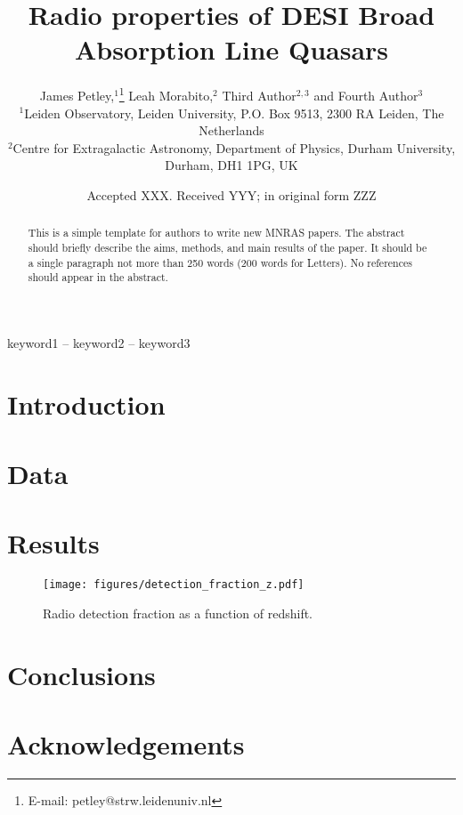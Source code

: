 \documentclass[fleqn,usenatbib]{mnras}
\title[DESI Radio BALQSOs]{Radio properties of DESI Broad Absorption Line Quasars}
\author[Petley et al.]{
James Petley,$^{1}$\thanks{E-mail: petley@strw.leidenuniv.nl}
Leah Morabito,$^{2}$
Third Author$^{2,3}$
and Fourth Author$^{3}$
\\
$^{1}$Leiden Observatory, Leiden University, P.O. Box 9513, 2300 RA Leiden, The Netherlands\\
$^{2}$Centre for Extragalactic Astronomy, Department of Physics, Durham University, Durham, DH1 1PG, UK\\
}
\date{Accepted XXX. Received YYY; in original form ZZZ}
\begin{document}
\maketitle

\begin{abstract}
This is a simple template for authors to write new MNRAS papers.
The abstract should briefly describe the aims, methods, and main results of the paper.
It should be a single paragraph not more than 250 words (200 words for Letters).
No references should appear in the abstract.
\end{abstract}

\begin{keywords}
keyword1 -- keyword2 -- keyword3
\end{keywords}



\section{Introduction}

\section{Data}

\section{Results}

\begin{figure}
    \centering
    \texttt{[image: figures/detection\_fraction\_z.pdf]}
    \caption{Radio detection fraction as a function of redshift.}
    \label{fig:detection_fraction}
\end{figure}



\section{Conclusions}



\section*{Acknowledgements}
\end{document}
